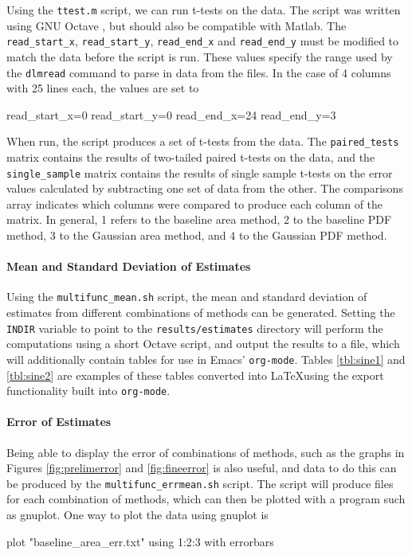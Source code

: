 \documentclass[a4paper,11pt]{article}
\begin{document}
\begin{appendices}
    Using the \texttt{ttest.m} script, we can run t-tests on the data. The script
    was written using GNU Octave \cite{octave}, but should also be compatible with
    Matlab. The \texttt{read\_start\_x}, \texttt{read\_start\_y},
    \texttt{read\_end\_x} and \texttt{read\_end\_y} must be modified to match the
    data before the script is run. These values specify the range used by the
    \texttt{dlmread} command to parse in data from the files. In the case of 4
    columns with 25 lines each, the values are set to \small
    \begin{verbatimtab}
    read_start_x=0
    read_start_y=0
    read_end_x=24
    read_end_y=3
    \end{verbatimtab}
    \normalsize
    When run, the script produces a set of t-tests from the data. The
    \texttt{paired\_tests} matrix contains the results of two-tailed paired t-tests
    on the data, and the \texttt{single\_sample} matrix contains the results of
    single sample t-tests on the error values calculated by subtracting one set of
    data from the other. The comparisons array indicates which columns were compared
    to produce each column of the matrix. In general, 1 refers to the baseline area
    method, 2 to the baseline PDF method, 3 to the Gaussian area method, and 4 to
    the Gaussian PDF method.

    \paragraph{Mean and Standard Deviation of Estimates} Using the \texttt{multifunc\_mean.sh} script, the mean
    and standard deviation of estimates from different combinations of methods can
    be generated. Setting the \texttt{INDIR} variable to point to the
    \texttt{results/estimates} directory will perform the computations using a short
    Octave script, and output the results to a file, which will additionally contain
    tables for use in Emacs' \texttt{org-mode}. Tables \ref{tbl:sine1} and
    \ref{tbl:sine2} are examples of these tables converted into \LaTeX using the
    export functionality built into \texttt{org-mode}.

    \paragraph{Error of Estimates}
    Being able to display the error of combinations of methods, such as the graphs
    in Figures \ref{fig:prelimerror} and \ref{fig:fineerror} is also useful, and
    data to do this can be produced by the \texttt{multifunc\_errmean.sh}
    script. The script will produce files for each combination of methods, which can
    then be plotted with a program such as gnuplot. One way to plot the data using
    gnuplot is
    \small
    \begin{verbatimtab}
    plot "baseline_area_err.txt" using 1:2:3 with errorbars
    \end{verbatimtab}
    \normalsize

\end{appendices}
\end{document}
